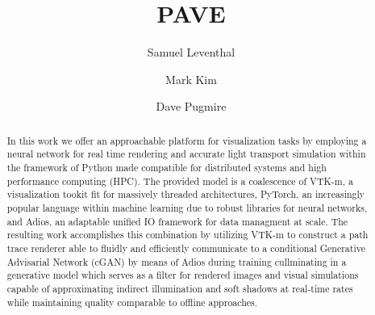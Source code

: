 \documentclass[sigconf,authordraft]{acmart}
\begin{document}
\title{PAVE}

\author{Samuel Leventhal}
\author{Mark Kim}

\author{Dave Pugmire}
\authornotemark[1]


\renewcommand{\shortauthors}{Leventhal and Kim, et al.}

\begin{abstract}
  In this work we offer an approachable platform for visualization tasks by employing a neural network for real time rendering and accurate light transport simulation within the framework of Python made compatible for distributed systems and high performance computing (HPC). The provided model is a coalescence of VTK-m, a visualization tookit fit for massively threaded architectures, PyTorch, an  increasingly popular language within machine learning due to robust libraries for neural networks, and Adios, an adaptable unified IO framework for data managment at scale. The resulting work accomplishes this combination by utilizing VTK-m to construct a path trace renderer able to fluidly and efficiently communicate to a conditional Generative Advisarial Network (cGAN) by means of Adios during training cullminating in a generative model which serves as a filter for rendered images and visual simulations capable of approximating indirect illumination and soft shadows at real-time rates while maintaining quality comparable to offline approaches.
\end{abstract}
\end{document}
